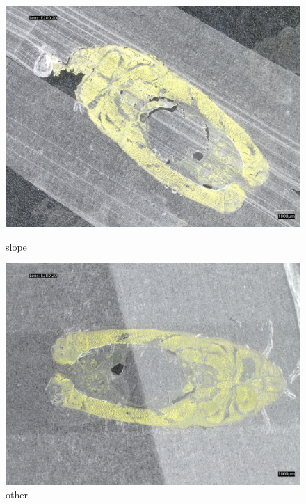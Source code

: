 \begin{figure}
    \centering
    \begin{minipage}{0.45\textwidth}
        \centering
        \includegraphics[width=\textwidth]{./fig/sample_1/slope.jpg}
        \caption{slope}
        \label{fig:slope}
    \end{minipage}
    \begin{minipage}{0.45\textwidth}
        \centering
        \includegraphics[width=\textwidth]{./fig/sample_1/other.jpg}
        \caption{other}
        \label{fig:other}
    \end{minipage}
\end{figure}

